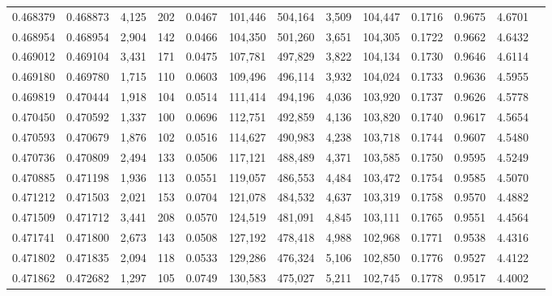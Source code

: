 \begin{tabular}{rrrrrrrrrrrrr}
0.468379 & 0.468873 & 4,125 &   202 &                                     0.0467 & 101,446 & 504,164 &   3,509 & 104,447 & 0.1716 & 0.9675 & 4.6701 \\
0.468954 & 0.468954 & 2,904 &   142 &                                     0.0466 & 104,350 & 501,260 &   3,651 & 104,305 & 0.1722 & 0.9662 & 4.6432 \\
0.469012 & 0.469104 & 3,431 &   171 &                                     0.0475 & 107,781 & 497,829 &   3,822 & 104,134 & 0.1730 & 0.9646 & 4.6114 \\
0.469180 & 0.469780 & 1,715 &   110 &                                     0.0603 & 109,496 & 496,114 &   3,932 & 104,024 & 0.1733 & 0.9636 & 4.5955 \\
0.469819 & 0.470444 & 1,918 &   104 &                                     0.0514 & 111,414 & 494,196 &   4,036 & 103,920 & 0.1737 & 0.9626 & 4.5778 \\
0.470450 & 0.470592 & 1,337 &   100 &                                     0.0696 & 112,751 & 492,859 &   4,136 & 103,820 & 0.1740 & 0.9617 & 4.5654 \\
0.470593 & 0.470679 & 1,876 &   102 &                                     0.0516 & 114,627 & 490,983 &   4,238 & 103,718 & 0.1744 & 0.9607 & 4.5480 \\
0.470736 & 0.470809 & 2,494 &   133 &                                     0.0506 & 117,121 & 488,489 &   4,371 & 103,585 & 0.1750 & 0.9595 & 4.5249 \\
0.470885 & 0.471198 & 1,936 &   113 &                                     0.0551 & 119,057 & 486,553 &   4,484 & 103,472 & 0.1754 & 0.9585 & 4.5070 \\
0.471212 & 0.471503 & 2,021 &   153 &                                     0.0704 & 121,078 & 484,532 &   4,637 & 103,319 & 0.1758 & 0.9570 & 4.4882 \\
0.471509 & 0.471712 & 3,441 &   208 &                                     0.0570 & 124,519 & 481,091 &   4,845 & 103,111 & 0.1765 & 0.9551 & 4.4564 \\
0.471741 & 0.471800 & 2,673 &   143 &                                     0.0508 & 127,192 & 478,418 &   4,988 & 102,968 & 0.1771 & 0.9538 & 4.4316 \\
0.471802 & 0.471835 & 2,094 &   118 &                                     0.0533 & 129,286 & 476,324 &   5,106 & 102,850 & 0.1776 & 0.9527 & 4.4122 \\
0.471862 & 0.472682 & 1,297 &   105 &                                     0.0749 & 130,583 & 475,027 &   5,211 & 102,745 & 0.1778 & 0.9517 & 4.4002 \\

\end{tabular}
